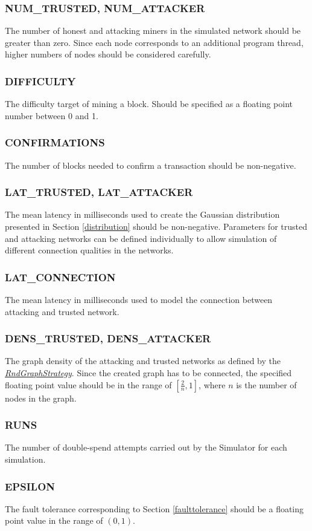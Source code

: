 \documentclass[a4paper,12pt,twoside]{report}
\begin{document}
\subsubsection{NUM\_TRUSTED, NUM\_ATTACKER}
The number of honest and attacking miners in the simulated network should be greater than zero. Since each node corresponds to an additional program thread, higher numbers of nodes should be considered carefully.
\subsubsection{DIFFICULTY}
The difficulty target of mining a block. Should be specified as a floating point number between 0 and 1.
\subsubsection{CONFIRMATIONS}
The number of blocks needed to confirm a transaction should be non-negative.
\subsubsection{LAT\_TRUSTED, LAT\_ATTACKER}
The mean latency in milliseconds used to create the Gaussian distribution presented in Section \ref{distribution} should be non-negative. Parameters for trusted and attacking networks can be defined individually to allow simulation of different connection qualities in the networks.
\subsubsection{LAT\_CONNECTION}
The mean latency in milliseconds used to model the connection between attacking and trusted network.
\subsubsection{DENS\_TRUSTED, DENS\_ATTACKER}
The graph density of the attacking and trusted networks as defined by the \hyperref[rndgraphstrategy]{\textit{RndGraphStrategy}}. Since the created graph has to be connected, the specified floating point value should be in the range of $[\frac{2}{n}, 1]$, where $n$ is the number of nodes in the graph.
\subsubsection{RUNS}
The number of double-spend attempts carried out by the Simulator for each simulation.
\subsubsection{EPSILON}
The fault tolerance corresponding to Section \ref{faulttolerance} should be a floating point value in the range of $(0, 1)$.
\end{document}
